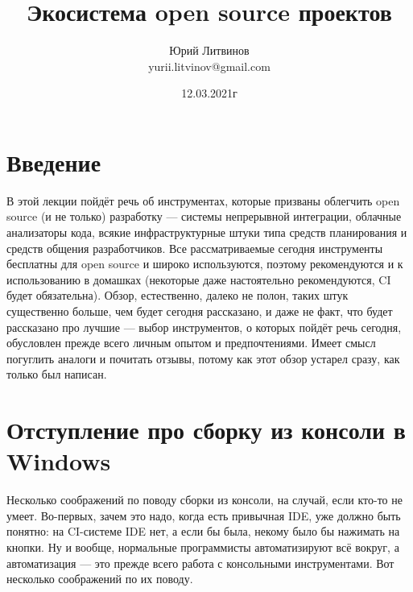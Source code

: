 \documentclass[a5paper]{article}
\title{Экосистема open source проектов}
\author{Юрий Литвинов\\\small{yurii.litvinov@gmail.com}}
\date{12.03.2021г}
\begin{document}
\maketitle
\thispagestyle{empty}

\section{Введение}

В этой лекции пойдёт речь об инструментах, которые призваны облегчить open source (и не только) разработку --- системы непрерывной интеграции, облачные анализаторы кода, всякие инфраструктурные штуки типа средств планирования и средств общения разработчиков. Все рассматриваемые сегодня инструменты бесплатны для open source и широко используются, поэтому рекомендуются и к использованию в домашках (некоторые даже настоятельно рекомендуются, CI будет обязательна). Обзор, естественно, далеко не полон, таких штук существенно больше, чем будет сегодня рассказано, и даже не факт, что будет рассказано про лучшие --- выбор инструментов, о которых пойдёт речь сегодня, обусловлен прежде всего личным опытом и предпочтениями. Имеет смысл погуглить аналоги и почитать отзывы, потому как этот обзор устарел сразу, как только был написан.

\section{Отступление про сборку из консоли в Windows}

Несколько соображений по поводу сборки из консоли, на случай, если кто-то не умеет. Во-первых, зачем это надо, когда есть привычная IDE, уже должно быть понятно: на CI-системе IDE нет, а если бы была, некому было бы нажимать на кнопки. Ну и вообще, нормальные программисты автоматизируют всё вокруг, а автоматизация --- это прежде всего работа с консольными инструментами. Вот несколько соображений по их поводу.
\end{document}

